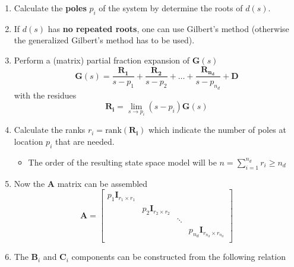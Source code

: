 \newpar{}
\begin{enumerate}
    \item Calculate the \textbf{poles} $p_i$ of the system by determine the roots of $d(s)$.
    \item If $d(s)$ has \textbf{no repeated roots}, one can use Gilbert's method (otherwise the generalized Gilbert's method has to be used).
    \item Perform a (matrix) partial fraction expansion of $\mathbf{G}(s)$
          \begin{equation*}
              \mathbf{G}(s)=\frac{\mathbf{R_1}}{s-p_1}+\frac{\mathbf{R_2}}{s-p_2}+\ldots+\frac{\mathbf{R_{n_d}}}{s-p_{n_d}}+\mathbf{D}
          \end{equation*} with the residues
          \begin{equation*}
              \mathbf{R_i}=\lim_{s\to p_i}(s-p_i)\mathbf{G}(s)
          \end{equation*}
    \item Calculate the ranks $r_i = \text{rank}(\mathbf{R_i})$ which indicate the number of poles at location $p_i$ that are needed.
          \begin{itemize}
              \item The order of the resulting state space model will be $n=\sum_{i=1}^{n_d}r_i\geq n_d$
          \end{itemize}
    \item Now the $\mathbf{A}$ matrix can be assembled
          \begin{equation*}
              \mathbf{A}  =\begin{bmatrix}
                  p_1 \mathbf{I}_{r_1\times r_1} &                                &        &                                            \\
                                                 & p_2 \mathbf{I}_{r_2\times r_2} &        &                                            \\
                                                 &                                & \ddots &                                            \\
                                                 &                                &        & p_{n_d} \mathbf{I}_{r_{n_d}\times r_{n_d}} \\
              \end{bmatrix}
          \end{equation*}
    \item The $\mathbf{B}_i$ and $\mathbf{C}_i$ components can be constructed from the following relation

\end{enumerate}
